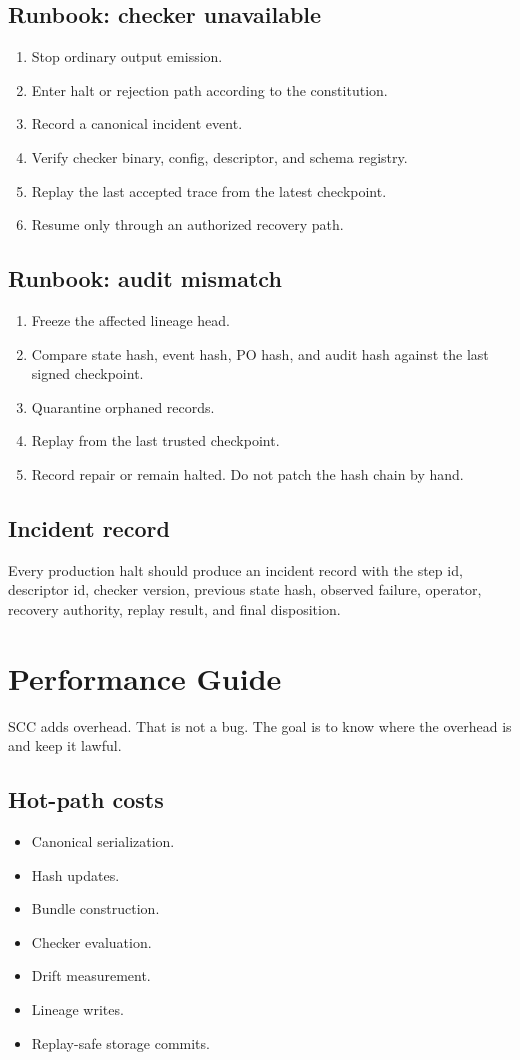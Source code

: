 \documentclass[11pt,oneside]{article}
\begin{document}
\subsection{Runbook: checker unavailable}
\begin{enumerate}
\item Stop ordinary output emission.
\item Enter halt or rejection path according to the constitution.
\item Record a canonical incident event.
\item Verify checker binary, config, descriptor, and schema registry.
\item Replay the last accepted trace from the latest checkpoint.
\item Resume only through an authorized recovery path.
\end{enumerate}

\subsection{Runbook: audit mismatch}
\begin{enumerate}
\item Freeze the affected lineage head.
\item Compare state hash, event hash, PO hash, and audit hash against the last signed checkpoint.
\item Quarantine orphaned records.
\item Replay from the last trusted checkpoint.
\item Record repair or remain halted. Do not patch the hash chain by hand.
\end{enumerate}

\subsection{Incident record}
Every production halt should produce an incident record with the step id, descriptor id, checker version, previous state hash, observed failure, operator, recovery authority, replay result, and final disposition.


\section{Performance Guide}
SCC adds overhead. That is not a bug. The goal is to know where the overhead is and keep it lawful.

\subsection{Hot-path costs}
\begin{itemize}
\item Canonical serialization.
\item Hash updates.
\item Bundle construction.
\item Checker evaluation.
\item Drift measurement.
\item Lineage writes.
\item Replay-safe storage commits.
\end{itemize}
\end{document}
